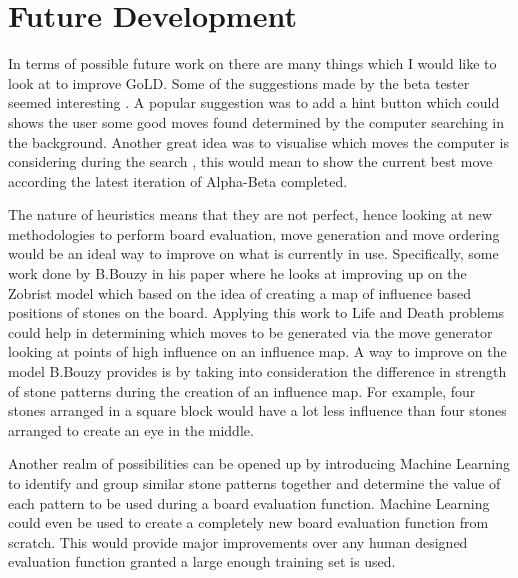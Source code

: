 \documentclass{l4proj}
\begin{document}
\section{Future Development}
In terms of possible future work on there are many things which I would like to look at to improve GoLD. Some of the suggestions made by the beta tester seemed interesting . A popular suggestion was to add a hint button which could shows the user some good moves found determined by the computer searching in the background. Another great idea was to visualise which moves the computer is considering during the search , this would mean to show the current best move according the latest iteration of Alpha-Beta completed.

The nature of heuristics means that they are not perfect, hence looking at new methodologies to perform board evaluation, move generation and move ordering would be an ideal way to improve on what is currently in use. Specifically, some work done by B.Bouzy in his paper \cite{Bouzy2003} where he looks at improving up on the Zobrist model \cite{Zobrist1969} which based on the idea of creating a map of influence based positions of stones on the board. Applying this work to Life and Death problems could help in determining which moves to be generated via the move generator looking at points of high influence on an influence map. A way to improve on the model B.Bouzy provides is by taking into consideration the difference in strength of stone patterns during the creation of an influence map. For example, four stones arranged in a square block would have a lot less influence than four stones arranged to create an eye in the middle.

Another realm of possibilities can be opened up by introducing Machine Learning to identify and group similar stone patterns together and determine the value of each pattern to be used during a board evaluation function. Machine Learning could even be used to create a completely new board evaluation function from scratch. This would provide major improvements over any human designed evaluation function granted a large enough training set is used.
\end{document}
